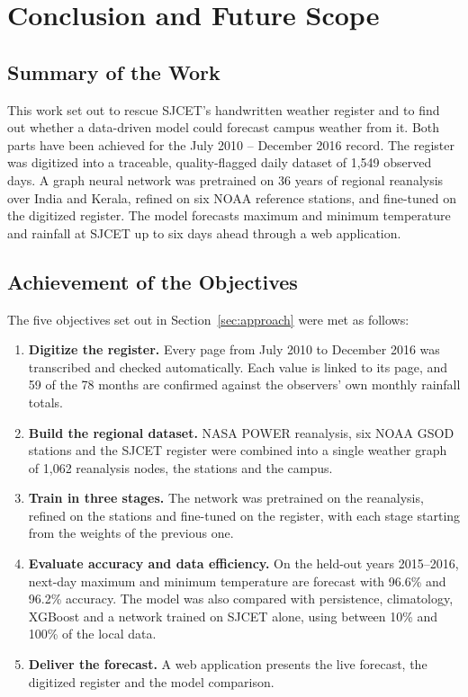 \setcounter{equation}{0}
\chapter{Conclusion and Future Scope}
\label{chap:conclusion}

\section{Summary of the Work}
\label{sec:con-summary}

This work set out to rescue SJCET's handwritten weather register and to find out whether a data-driven model could forecast campus weather from it. Both parts have been achieved for the July 2010 -- December 2016 record. The register was digitized into a traceable, quality-flagged daily dataset of 1,549 observed days. A graph neural network was pretrained on 36 years of regional reanalysis over India and Kerala, refined on six NOAA reference stations, and fine-tuned on the digitized register. The model forecasts maximum and minimum temperature and rainfall at SJCET up to six days ahead through a web application.

\section{Achievement of the Objectives}
\label{sec:con-objectives}

The five objectives set out in Section~\ref{sec:approach} were met as follows:

\begin{enumerate}[itemsep=0pt,topsep=4pt]
    \item \textbf{Digitize the register.} Every page from July 2010 to December 2016 was transcribed and checked automatically. Each value is linked to its page, and 59 of the 78 months are confirmed against the observers' own monthly rainfall totals.
    \item \textbf{Build the regional dataset.} NASA POWER reanalysis, six NOAA GSOD stations and the SJCET register were combined into a single weather graph of 1,062 reanalysis nodes, the stations and the campus.
    \item \textbf{Train in three stages.} The network was pretrained on the reanalysis, refined on the stations and fine-tuned on the register, with each stage starting from the weights of the previous one.
    \item \textbf{Evaluate accuracy and data efficiency.} On the held-out years 2015--2016, next-day maximum and minimum temperature are forecast with 96.6\% and 96.2\% accuracy. The model was also compared with persistence, climatology, XGBoost and a network trained on SJCET alone, using between 10\% and 100\% of the local data.
    \item \textbf{Deliver the forecast.} A web application presents the live forecast, the digitized register and the model comparison.
\end{enumerate}


